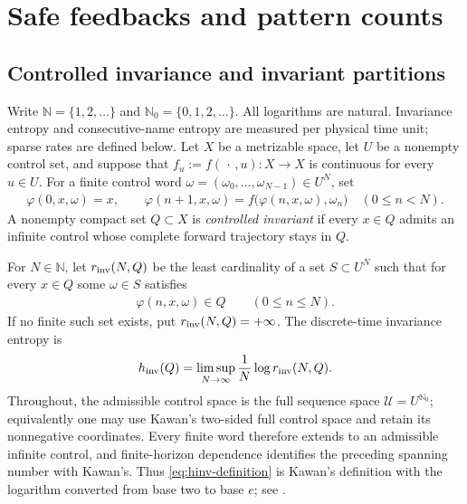 \documentclass[11pt,reqno]{amsart}
\numberwithin{equation}{section}
\theoremstyle{definition}
\newcommand{\N}{\mathbb N}
\newcommand{\Nzero}{\mathbb N_0}
\newcommand{\hinv}{h_{\mathrm{inv}}}
\begin{document}
\section{Safe feedbacks and pattern counts}\label{sec:control}

\subsection{Controlled invariance and invariant partitions}

Write $\N=\{1,2,\ldots\}$ and $\Nzero=\{0,1,2,\ldots\}$.
All logarithms are natural. Invariance entropy and consecutive-name entropy
are measured per physical time unit; sparse rates are defined below.
Let $X$ be a
metrizable space, let $U$ be a nonempty control set, and suppose that
$f_u:=f(\,\cdot\,,u):X\to X$ is continuous for every $u\in U$.  For a finite
control word $\omega=(\omega_0,\ldots,\omega_{N-1})\in U^N$, set
\begin{align*}
 \varphi(0,x,\omega)=x,
 \qquad
 \varphi(n+1,x,\omega)
 =f\bigl(\varphi(n,x,\omega),\omega_n\bigr)
 \quad(0\le n<N).
\end{align*}
A nonempty compact set $Q\subset X$ is \emph{controlled invariant} if every
$x\in Q$ admits an infinite control whose complete forward trajectory stays in
$Q$.

For $N\in\N$, let $r_{\rm inv}(N,Q)$ be the least cardinality of a set
$S\subset U^N$ such that for every $x\in Q$ some $\omega\in S$ satisfies
\begin{align*}
 \varphi(n,x,\omega)\in Q\qquad(0\le n\le N).
\end{align*}
If no finite such set exists, put $r_{\rm inv}(N,Q)=+\infty$.  The
discrete-time invariance entropy is
\begin{equation}\label{eq:hinv-definition}
 \hinv(Q)=\limsup_{N\to\infty}\frac1N\log r_{\rm inv}(N,Q).
\end{equation}
Throughout, the admissible control space is the full sequence space
$\mathcal U=U^{\Nzero}$; equivalently one may use Kawan's two-sided full
control space and retain its nonnegative coordinates.  Every finite word
therefore extends to an admissible infinite control, and finite-horizon
dependence identifies the preceding spanning number with Kawan's.  Thus
\eqref{eq:hinv-definition} is Kawan's definition with the logarithm converted
from base two to base $e$; see \cite[Definition~2.2, p.~44]{Kawan2013}.
\end{document}

